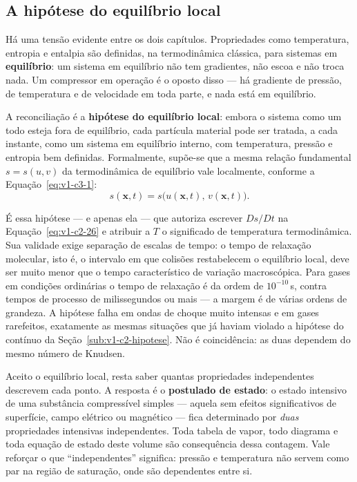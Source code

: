 \documentclass[12pt,a4paper]{article}
\numberwithin{equation}{section}
\numberwithin{table}{section}
\numberwithin{figure}{section}
\begin{document}
\subsection{A hipótese do equilíbrio local}\label{sub:v1-c3-equilibrio}

Há uma tensão evidente entre os dois capítulos. Propriedades como temperatura,
entropia e entalpia são definidas, na termodinâmica clássica, para sistemas em
\textbf{equilíbrio}: um sistema em equilíbrio não tem gradientes, não escoa e
não troca nada. Um compressor em operação é o oposto disso --- há gradiente de
pressão, de temperatura e de velocidade em toda parte, e nada está em
equilíbrio.

A reconciliação é a \textbf{hipótese do equilíbrio local}: embora o sistema
como um todo esteja fora de equilíbrio, cada partícula material pode ser
tratada, a cada instante, como um sistema em equilíbrio interno, com
temperatura, pressão e entropia bem definidas. Formalmente, supõe-se que a
mesma relação fundamental $s = s(u,v)$ da termodinâmica de equilíbrio vale
localmente, conforme a Equação~\eqref{eq:v1-c3-1}:
\begin{equation}\label{eq:v1-c3-1}
s(\mathbf{x},t) = s\big(u(\mathbf{x},t),\, v(\mathbf{x},t)\big).
\end{equation}

É essa hipótese --- e apenas ela --- que autoriza escrever $Ds/Dt$ na
Equação~\eqref{eq:v1-c2-26} e atribuir a $T$ o significado de temperatura
termodinâmica. Sua validade exige separação de escalas de tempo: o tempo de
relaxação molecular, isto é, o intervalo em que colisões restabelecem o
equilíbrio local, deve ser muito menor que o tempo característico de variação
macroscópica. Para gases em condições ordinárias o tempo de relaxação é da
ordem de $10^{-10}\,$s, contra tempos de processo de milissegundos ou mais
--- a margem é de várias ordens de grandeza. A hipótese falha em ondas de
choque muito intensas e em gases rarefeitos, exatamente as mesmas situações
que já haviam violado a hipótese do contínuo da
Seção~\ref{sub:v1-c2-hipotese}. Não é coincidência: as duas dependem do mesmo
número de Knudsen.

Aceito o equilíbrio local, resta saber quantas propriedades independentes
descrevem cada ponto. A resposta é o \textbf{postulado de estado}: o estado
intensivo de uma substância compressível simples --- aquela sem efeitos
significativos de superfície, campo elétrico ou magnético --- fica determinado
por \emph{duas} propriedades intensivas independentes. Toda tabela de vapor,
todo diagrama e toda equação de estado deste volume são consequência dessa
contagem. Vale reforçar o que ``independentes'' significa: pressão e
temperatura não servem como par na região de saturação, onde são dependentes
entre si.
\end{document}
